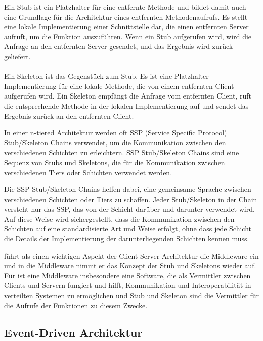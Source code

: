 \documentclass[../vs-script-first-v01.tex]{subfiles}
\begin{document}
\begin{itemize}
Ein Stub ist ein Platzhalter für eine entfernte Methode und bildet damit auch eine Grundlage für die Architektur eines entfernten Methodenaufrufs. Es stellt eine lokale Implementierung einer Schnittstelle dar, die einen entfernten Server aufruft, um die Funktion auszuführen. Wenn ein Stub aufgerufen wird, wird die Anfrage an den entfernten Server gesendet, und das Ergebnis wird zurück geliefert.
\\\\
Ein Skeleton ist das Gegenstück zum Stub. Es ist eine Platzhalter-Implementierung für eine lokale Methode, die von einem entfernten Client aufgerufen wird. Ein Skeleton empfängt die Anfrage vom entfernten Client, ruft die entsprechende Methode in der lokalen Implementierung auf und sendet das Ergebnis zurück an den entfernten Client.

In einer n-tiered Architektur werden oft SSP (Service Specific Protocol) Stub/Skeleton Chains verwendet, um die Kommunikation zwischen den verschiedenen Schichten zu erleichtern. SSP Stub/Skeleton Chains sind eine Sequenz von Stubs und Skeletons, die für die Kommunikation zwischen verschiedenen Tiers oder Schichten verwendet werden.

Die SSP Stub/Skeleton Chains helfen dabei, eine gemeinsame Sprache zwischen verschiedenen Schichten oder Tiers zu schaffen. Jeder Stub/Skeleton in der Chain versteht nur das SSP, das von der Schicht darüber und darunter verwendet wird. Auf diese Weise wird sichergestellt, dass die Kommunikation zwischen den Schichten auf eine standardisierte Art und Weise erfolgt, ohne dass jede Schicht die Details der Implementierung der darunterliegenden Schichten kennen muss.
\end{itemize}

\cite{tanenbaum2017distributed} führt als einen wichtigen Aspekt der Client-Server-Architektur die Middleware ein und in die Middleware nimmt er das Konzept der Stub und Skeletons wieder auf. Für \cite{tanenbaum2017distributed} ist eine Middleware insbesondere eine Software, die als Vermittler zwischen Clients und Servern fungiert und hilft, Kommunikation und Interoperabilität in verteilten Systemen zu ermöglichen und Stub und Skeleton sind die Vermittler für die Aufrufe der Funktionen zu diesem Zwecke.
              
\subsection{Event-Driven Architektur}
\end{document}
